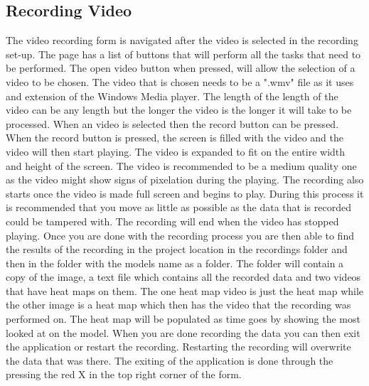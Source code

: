 \subsection{Recording Video}
The video recording form is navigated after the video is selected in the recording set-up. The page has a list of buttons that will perform all the tasks that need to be performed. The open video button when pressed, will allow the selection of a video to be chosen. The video that is chosen needs to be a ".wmv" file as it uses and extension of the Windows Media player. The length of the length of the video can be any length but the longer the video is the longer it will take to be processed. When an video is selected then the record button can be pressed. When the record button is pressed, the screen is filled with the video and the video will then start playing. The video is expanded to fit on the entire width and height of the screen. The video is recommended to be a medium quality one as the video might show signs of pixelation during the playing. The recording also starts once the video is made full screen and begins to play. During this process it is recommended that you move as little as possible as the data that is recorded could be tampered with. The recording will end when the video has stopped playing. Once you are done with the recording process you are then able to find the results of the recording in the project location in the recordings folder and then in the folder with the models name as a folder. The folder will contain a copy of the image, a text file which contains all the recorded data and two videos that have heat maps on them. The one heat map video is just the heat map while the other image is a heat map which then has the video that the recording was performed on. The heat map will be populated as time goes by showing the most looked at on the model. When you are done recording the data you can then exit the application or restart the recording. Restarting the recording will overwrite the data  that was there. The exiting of the application is done through the pressing the red X in the top right corner of the form.

